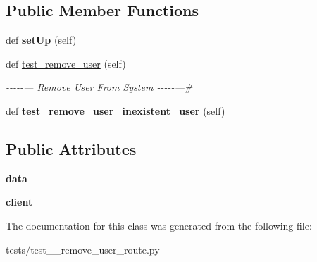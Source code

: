 \subsection*{Public Member Functions}
\begin{DoxyCompactItemize}
\item 
\mbox{\label{classtests_1_1test__12__remove__user__route_1_1_test_user_routes_acc5850df5f127b456421645d163d651b}} 
def {\bfseries set\+Up} (self)
\item 
\mbox{\label{classtests_1_1test__12__remove__user__route_1_1_test_user_routes_a5231432a4fe390ec295e86878dda9504}} 
def \hyperlink{classtests_1_1test__12__remove__user__route_1_1_test_user_routes_a5231432a4fe390ec295e86878dda9504}{test\+\_\+remove\+\_\+user} (self)
\begin{DoxyCompactList}\small\item\em -\/-\/-\/-\/-\/--- Remove User From System -\/-\/-\/-\/-\/---\# \end{DoxyCompactList}\item 
\mbox{\label{classtests_1_1test__12__remove__user__route_1_1_test_user_routes_a7522feaba9c8620b9aa57472af3091b4}} 
def {\bfseries test\+\_\+remove\+\_\+user\+\_\+inexistent\+\_\+user} (self)
\end{DoxyCompactItemize}
\subsection*{Public Attributes}
\begin{DoxyCompactItemize}
\item 
\mbox{\label{classtests_1_1test__12__remove__user__route_1_1_test_user_routes_a50ad0e8b71fbace7abfca6526345acef}} 
{\bfseries data}
\item 
\mbox{\label{classtests_1_1test__12__remove__user__route_1_1_test_user_routes_af5e6a4f409e4a00562e66876c3f8a459}} 
{\bfseries client}
\end{DoxyCompactItemize}


The documentation for this class was generated from the following file\+:\begin{DoxyCompactItemize}
\item 
tests/test\+\_\+\_\+remove\+\_\+user\+\_\+route.\+py\end{DoxyCompactItemize}
